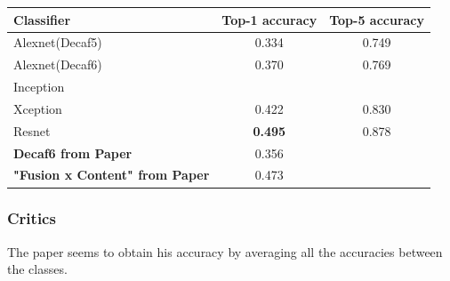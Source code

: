 	
\begin{tabularx}{10cm}{|X|c|c|}
	 \hline
	 \textbf{Classifier} & \textbf{Top-1 accuracy} & \textbf{Top-5 accuracy}  \\
	 \hline
	 Alexnet(Decaf5) & 0.334 & 0.749\\
	 \hline
	 Alexnet(Decaf6) & 0.370 & 0.769 \\
	 \hline
	 Inception &  & \\
	 \hline
	 Xception & 0.422 & 0.830\\
	 \hline
	 Resnet & \textbf{0.495} & 0.878\\
	 \hline
	 \textbf{Decaf6 from Paper} & 0.356 & \\
	 \hline
	 \textbf{"Fusion x Content" from Paper} & 0.473 & \\
	 \hline
\end{tabularx} 


\subsubsection{Critics}
	The paper seems to obtain his accuracy by averaging all the accuracies between the classes.



